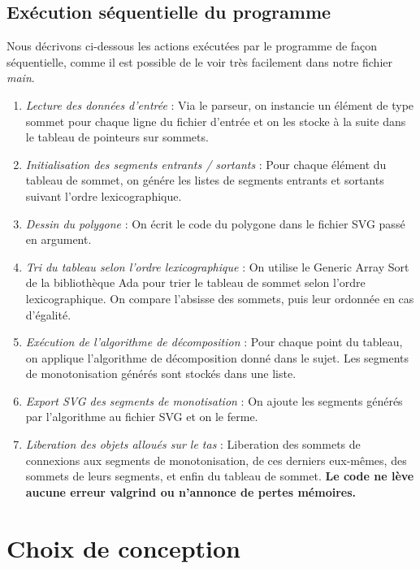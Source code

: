 \documentclass[10.9pt]{article}
\begin{document}
\newpage

\subsection{Exécution séquentielle du programme}
Nous décrivons ci-dessous les actions exécutées par le programme de
façon séquentielle, comme il est possible de le voir très facilement
dans notre fichier \emph{main}.

\begin{enumerate}
\item \emph{Lecture des données d'entrée} : Via le parseur, on
  instancie un élément de type sommet pour chaque ligne du fichier
  d'entrée et on les stocke à la suite dans le tableau de pointeurs sur sommets.
\item \emph{Initialisation des segments entrants / sortants} : Pour
  chaque élément du tableau de sommet, on génére les listes de
  segments entrants et sortants suivant l'ordre lexicographique.
\item \emph{Dessin du polygone} : On écrit le code du polygone dans le
  fichier SVG passé en argument.
\item \emph{Tri du tableau selon l'ordre lexicographique} : On utilise
  le Generic Array Sort de la bibliothèque Ada pour trier le tableau
  de sommet selon l'ordre lexicographique. On compare l'absisse des
  sommets, puis leur ordonnée en cas d'égalité.
\item \emph{Exécution de l'algorithme de décomposition} : Pour chaque
  point du tableau, on applique l'algorithme de décomposition donné
  dans le sujet. Les segments de monotonisation générés sont stockés
  dans une liste.
\item \emph{Export SVG des segments de monotisation} : On ajoute les
  segments générés par l'algorithme au fichier SVG et on le ferme.
\item \emph{Liberation des objets alloués sur le tas} : Liberation des
  sommets de connexions aux segments de monotonisation, de ces
  derniers eux-mêmes, des sommets de leurs segments, et enfin du
  tableau de sommet. \textbf{Le code ne lève aucune erreur valgrind ou
    n'annonce de pertes mémoires.}
\end{enumerate}

\section{Choix de conception}
\end{document}
